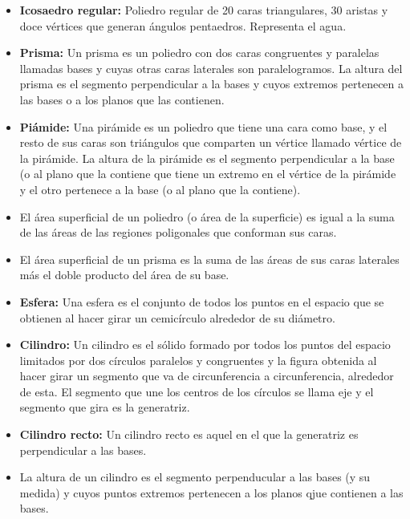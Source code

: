 \documentclass[•]{article}
\begin{document}
\begin{flushleft}
\begin{itemize}
			\item \textbf{Icosaedro regular: }Poliedro regular de 20 caras triangulares, 30 aristas y doce v\'ertices que generan \'angulos pentaedros. Representa el agua.
			
			\item \textbf{Prisma: }Un prisma es un poliedro con dos caras congruentes y paralelas llamadas bases y cuyas otras caras laterales son paralelogramos. La altura del prisma es el segmento perpendicular a la bases y cuyos extremos pertenecen a las bases o a los planos que las contienen.
			
			\item \textbf{Pi\'amide: }Una pir\'amide es un poliedro que tiene una cara como base, y el resto de sus caras son tri\'angulos que comparten un v\'ertice llamado v\'ertice de la pir\'amide. La altura de la pir\'amide es el segmento perpendicular a la base (o al plano que la contiene que tiene un extremo en el v\'ertice de la pir\'amide y el otro pertenece a la base (o al plano que la contiene).
			
			\item El \'area superficial de un poliedro (o \'area de la superficie) es igual a la suma de las \'areas de las regiones poligonales que conforman sus caras.
			
			\item El \'area superficial de un prisma es la suma de las \'areas de sus caras laterales m\'as el doble producto del \'area de su base.
			
			\item \textbf{Esfera: }Una esfera es el conjunto de todos los puntos en el espacio que se obtienen al hacer girar un cemic\'irculo alrededor de su di\'ametro.
			
			\item \textbf{Cilindro: }Un cilindro es el s\'olido formado por todos los puntos del espacio limitados por dos c\'irculos paralelos y congruentes y la figura obtenida al hacer girar un segmento que va de circunferencia a circunferencia, alrededor de esta. El segmento que une los centros de los c\'irculos se llama eje y el segmento que gira es la generatriz.
			\item \textbf{Cilindro recto: }Un cilindro recto es aquel en el que la generatriz es perpendicular a las bases.
			\item La altura de un cilindro es el segmento perpenducular a las bases (y su medida) y cuyos puntos extremos pertenecen a los planos qjue contienen a las bases. 
			

\end{itemize}
\end{flushleft}
\end{document}

